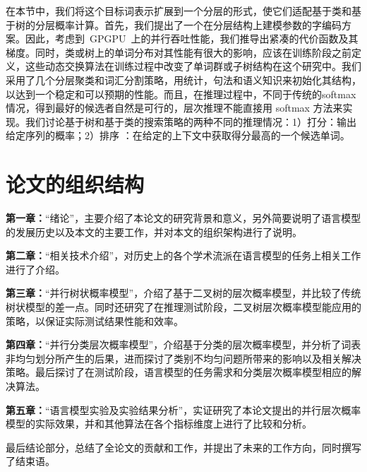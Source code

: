 在本节中，我们将这个目标词表示扩展到一个分层的形式，使它们适配基于类和基于树的分层概率计算。首先，我们提出了一个在分层结构上建模参数的字编码方案。因此，考虑到~GPGPU~上的并行吞吐性能，我们推导出紧凑的代价函数及其梯度。同时，类或树上的单词分布对其性能有很大的影响，应该在训练阶段之前定义，这些动态交换算法在训练过程中改变了单词群或子树结构在这个研究中。我们采用了几个分层聚类和词汇分割策略，用统计，句法和语义知识来初始化其结构，以达到一个稳定和可以预期的性能。而且，在推理过程中，不同于传统的softmax情况，得到最好的候选者自然是可行的，层次推理不能直接用 softmax 方法来实现。我们讨论基于树和基于类的搜索策略的两种不同的推理情况：1）打分：输出给定序列的概率；2）排序   ：在给定的上下文中获取得分最高的一个候选单词。
\section{论文的组织结构}
\textbf{第一章：}``绪论''，主要介绍了本论文的研究背景和意义，另外简要说明了语言模型的发展历史以及本文的主要工作，并对本文的组织架构进行了说明。

\textbf{第二章：}``相关技术介绍''，对历史上的各个学术流派在语言模型的任务上相关工作进行了介绍。

\textbf{第三章：}``并行树状概率模型''，介绍了基于二叉树的层次概率模型，并比较了传统树状模型的差一点。同时还研究了在推理测试阶段，二叉树层次概率模型能应用的策略，以保证实际测试结果性能和效率。


\textbf{第四章：}``并行分类层次概率模型''，介绍基于分类的层次概率模型，并分析了词表非均匀划分所产生的后果，进而探讨了类别不均匀问题所带来的影响以及相关解决策略。最后探讨了在测试阶段，语言模型的任务需求和分类层次概率模型相应的解决算法。

\textbf{第五章：}``语言模型实验及实验结果分析''，实证研究了本论文提出的并行层次概率模型的实际效果，并和其他算法在各个指标维度上进行了比较和分析。

最后结论部分，总结了全论文的贡献和工作，并提出了未来的工作方向，同时撰写了结束语。



